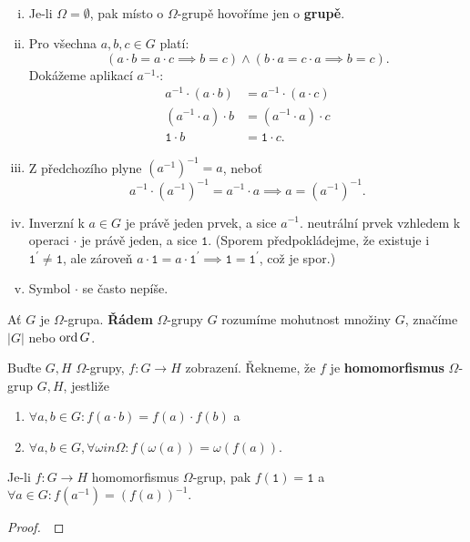 \begin{poznamka}\,
\begin{enumerate}[i.]
	\item Je-li $\Omega = \emptyset$, pak místo o $\Omega$-grupě hovoříme jen o \textbf{grupě}.
	\item Pro všechna $a,b,c\in G$ platí:
	$$
	    (a\cdot b = a\cdot c \implies b=c) \land (b\cdot a= c\cdot a \implies b=c).
	$$
	Dokážeme aplikací $a^{-1}\cdot:$
	\begin{align*}
		a^{-1}\cdot(a\cdot b) &=a^{-1}\cdot(a\cdot c) \\
		(a^{-1}\cdot a)\cdot b &=(a^{-1}\cdot a)\cdot c \\
		\mathtt 1 \cdot b &=\mathtt 1 \cdot c.
	\end{align*}
	\item Z předchozího plyne $\left( a^{-1} \right )^{-1}=a $, neboť
	$$
	    a^{-1}\cdot \left( a^{-1} \right )^{-1} = a^{-1}\cdot a \implies a=\left( a^{-1} \right )^{-1}.
	$$
	\item Inverzní k $a\in G$ je právě jeden prvek, a sice $a^{-1}$. neutrální prvek
	vzhledem k operaci $\cdot$ je právě jeden, a sice $\mathtt 1$. (Sporem předpokládejme, že existuje
	i $\mathtt 1^\prime\ne \mathtt 1$, ale zároveň $a\cdot \mathtt 1 = a\cdot\mathtt1^\prime\implies \mathtt 1 = \mathtt 1^\prime$,
	což je spor.)
	\item Symbol $\cdot$ se často nepíše.
\end{enumerate}
\end{poznamka}


\begin{definice}
	Ať $G$ je $\Omega$-grupa. \textbf{Řádem} $\Omega$-grupy $G$ rozumíme mohutnost množiny $G$, značíme
	$|G|$ nebo $\operatorname{ord} G$.
\end{definice}

\begin{definice}
	Buďte $G,H$ $\Omega$-grupy, $f:G\to H$ zobrazení. Řekneme, že $f$ je \textbf{homomorfismus}
	$\Omega$-grup $G,H$, jestliže
	\begin{enumerate}[$(i)$]
		\item $\forall a,b\in G: f(a\cdot b)=f(a)\cdot f(b)$ a
		\item $\forall a,b \in G, \forall \omega in \Omega: f(\omega(a))=\omega(f(a)).$
\end{enumerate}
\end{definice}

\begin{lemma}
	Je-li $f:G\to H$ homomorfismus $\Omega$-grup, pak $f(\mathtt 1)= \mathtt 1$ a $\forall a\in G:f \left( a^{-1} \right ) =\left( f(a) \right )^{-1} $.
\end{lemma}

\begin{proof}
	\,
\end{proof}
